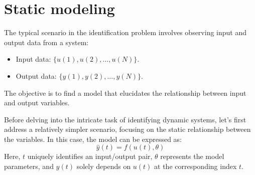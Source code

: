 \section{Static modeling}

The typical scenario in the identification problem involves observing input and output data from a system:
\begin{itemize}
    \item Input data: $\{u(1), u(2), ..., u(N)\}$.
    \item Output data: $\{y(1), y(2), ..., y(N)\}$. 
\end{itemize}
The objective is to find a model that elucidates the relationship between input and output variables.

Before delving into the intricate task of identifying dynamic systems, let's first address a relatively simpler scenario, focusing on the static relationship between the variables. 
In this case, the model can be expressed as:
\[\hat{y}(t)=f\left(u(t),\theta\right)\]
Here, $t$ uniquely identifies an input/output pair, $\theta$ represents the model parameters, and $y(t)$ solely depends on $u(t)$ at the corresponding index $t$.

